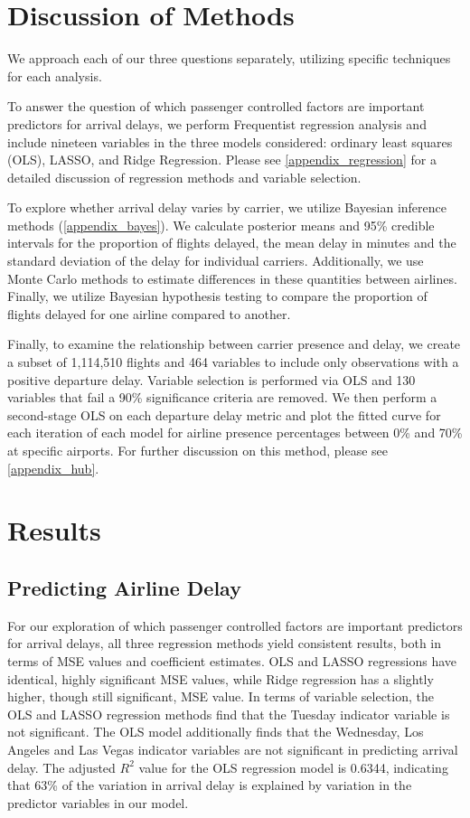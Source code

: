 \documentclass{article} %
\begin{document}
\section{Discussion of Methods}
\label{headings}

We approach each of our three questions separately, utilizing specific techniques for each analysis. 

To answer the question of which passenger controlled factors are important predictors for arrival delays, we perform Frequentist regression analysis and include nineteen variables in the three models considered: ordinary least squares (OLS), LASSO, and Ridge Regression. Please see \ref{appendix_regression} for a detailed discussion of regression methods and variable selection. 
 
To explore whether arrival delay varies by carrier, we utilize Bayesian inference methods (\ref{appendix_bayes}). We calculate posterior means and 95\% credible intervals for the proportion of flights delayed, the mean delay in minutes and the standard deviation of the delay for individual carriers. Additionally, we use Monte Carlo methods to estimate differences in these quantities between airlines. Finally, we utilize Bayesian hypothesis testing to compare the proportion of flights delayed for one airline compared to another. 

Finally, to examine the relationship between carrier presence and delay, we create a subset of 1,114,510 flights and 464 variables to include only observations with a positive departure delay. Variable selection is performed via OLS and 130 variables that fail a 90\% significance criteria are removed. We then perform a second-stage OLS on each departure delay metric and plot the fitted curve for each iteration of each model for airline presence percentages between 0\% and 70\% at specific airports. For further discussion on this method, please see \ref{appendix_hub}.

\section{Results}
\label{headings}

\subsection{Predicting Airline Delay}

For our exploration of which passenger controlled factors are important predictors for arrival delays, all three regression methods yield consistent results, both in terms of MSE values and coefficient estimates. OLS and LASSO regressions have identical, highly significant MSE values, while Ridge regression has a slightly higher, though still significant, MSE value. In terms of variable selection, the OLS and LASSO regression methods find that the Tuesday indicator variable is not significant. The OLS model additionally finds that the Wednesday, Los Angeles and Las Vegas indicator variables are not significant in predicting arrival delay. The adjusted $R^2$ value for the OLS regression model is 0.6344, indicating that 63\% of the variation in arrival delay is explained by variation in the predictor variables in our model.
\end{document}
